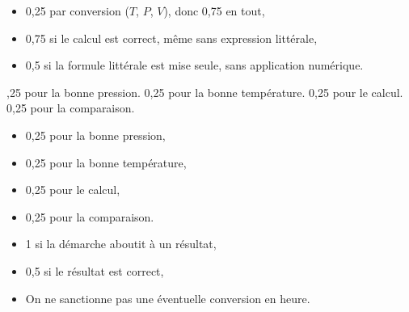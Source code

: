 \begin{multicols}{2}
\numeroQuestion  
\begin{itemize}
  \item 0,25 par conversion ($T$, $P$, $V$), donc 0,75 en tout,
  \item 0,75 si le calcul est correct, même sans expression littérale,
  \item 0,5 si la formule littérale est mise seule, sans application numérique.
\end{itemize}

,25 pour la bonne pression. 0,25 pour la bonne température. 0,25 pour le calcul. 0,25 pour la comparaison.
\begin{itemize}
  \item 0,25 pour la bonne pression,
  \item 0,25 pour la bonne température,
  \item 0,25 pour le calcul,
  \item 0,25 pour la comparaison.
\end{itemize}

\numeroQuestion
\begin{itemize}
  \item 1 si la démarche aboutit à un résultat,
  \item 0,5 si le résultat est correct,
  \item On ne sanctionne pas une éventuelle conversion en heure.
\end{itemize}
\end{multicols}

\newpage
{}

